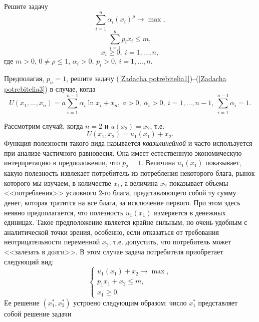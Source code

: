 \begin{exer}
    \label{CES2}

    Решите задачу
\[\sum_{i=1}^{n}\alpha_{i}(x_{i})^{\rho}\rightarrow\max,\]
\[\sum_{i=1}^{n}p_{i}x_{i}\leqslant m,\]
\[x_{i}\geqslant0,\ i=1,\ldots,n,\]
где  $m>0$, $0\neq \rho\leqslant1$, $\alpha_{i}>0$, $p_{i}>0$,
$i=1,\ldots,n$.

\end{exer}

\begin{exer}
    Предполагая, $p_{n}=1$, решите задачу
(\ref{Zadacha potrebitelia1})--(\ref{Zadacha potrebitelia3})
    в случае, когда
    \[U(x_{1},...,x_{n})=a\sum_{i=1}^{n-1}\alpha_{i}\ln x_{i}+x_{n}, \ a>0, \ \alpha_{i}>0, \
     i=1,\ldots,n-1, \ \sum_{i=1}^{n-1}\alpha_{i}=1.\]

\end{exer}


    Рассмотрим случай, когда $n=2$ и $u(x_{2})=x_{2}$, т.е.
    \[U(x_{1},x_{2})=u_{1}(x_{1})+x_{2}.\]
    Функция полезности такого вида называется \emph{квазилинейной} и часто
    используется при анализе частичного равновесия. Она имеет
    естественную
    экономическую интерпретацию в предположении, что $p_{2}=1$.
    Величина $u_{1}(x_{1})$
    показывает, какую полезность извлекает потребитель из
    потребления некоторого блага, рынок которого мы изучаем,
    в количестве $x_{1}$, а величина $x_{2}$ показывает объемы
    <<потребления>> условного $2$-го блага, представляющего собой ту
    сумму денег, которая тратится на все блага, за исключение первого. При этом здесь
    неявно предполагается, что полезность $u_{1}(x_{1})$
    измеряется в денежных единицах. Такое предположение является
    крайне сильным, но очень удобным с аналитической точки зрения,
    особенно, если отказаться от требования неотрицательности переменной $x_{2}$, т.е.
    допустить, что потребитель может <<залезать в долги>>. В этом
    случае задача потребителя приобретает следующий вид:
\begin{equation}
\label{max-pol-dop}
  \left\{
    \begin{array}{l}
      u_{1}(x_{1})+x_{2}\rightarrow\max, \\
      p_{1}x_{1}+x_{2}\leqslant m, \\
      x_{1}\geqslant0.
    \end{array}
  \right.
\end{equation}
    Ее решение $(x_{1}^{*},x_{2}^{*})$ устроено следующим образом:
    число $x_{1}^{*}$ представляет собой решение задачи


